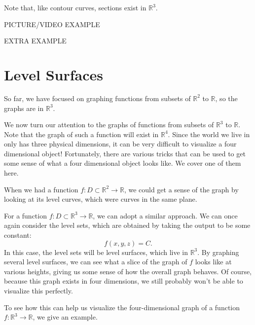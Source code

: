 \documentclass{ximera}
\begin{document}
Note that, like contour curves, sections exist in $\mathbb{R}^3$.

PICTURE/VIDEO EXAMPLE

EXTRA EXAMPLE

\section{Level Surfaces}

So far, we have focused on graphing functions from subsets of $\mathbb{R}^2$ to $\mathbb{R}$, so the graphs are in $\mathbb{R}^3$.

We now turn our attention to the graphs of functions from subsets of $\mathbb{R}^3$ to $\mathbb{R}$. Note that the graph of such a function will exist in $\mathbb{R}^4$. Since the world we live in only has three physical dimensions, it can be very difficult to visualize a four dimensional object! Fortunately, there are various tricks that can be used to get some sense of what a four dimensional object looks like. We cover one of them here.

When we had a function $f:D\subset\mathbb{R}^2\rightarrow\mathbb{R}$, we could get a sense of the graph by looking at its level curves, which were curves in the same plane.

For a function $f:D\subset\mathbb{R}^3\rightarrow\mathbb{R}$, we can adopt a similar approach. We can once again consider the level sets, which are obtained by taking the output to be some constant:
\[
f(x,y,z) = C.
\]
In this case, the level sets will be level surfaces, which live in $\mathbb{R}^3$. By graphing several level surfaces, we can see what a slice of the graph of $f$ looks like at various heights, giving us some sense of how the overall graph behaves. Of course, because this graph exists in four dimensions, we still probably won't be able to visualize this perfectly.

To see how this can help us visualize the four-dimensional graph of a function $f:\mathbb{R}^3\rightarrow\mathbb{R}$, we give an example.
\end{document}
